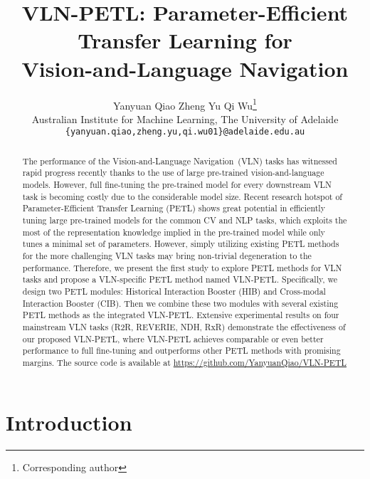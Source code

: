 \documentclass[10pt,twocolumn,letterpaper]{article}
\begin{document}
\title{VLN-PETL: Parameter-Efficient Transfer Learning for \\Vision-and-Language Navigation}

\author{
Yanyuan Qiao \quad  Zheng Yu  \quad Qi Wu\thanks{Corresponding author}\\
Australian Institute for Machine Learning, The University of Adelaide\\
{\tt\small \{yanyuan.qiao,zheng.yu,qi.wu01\}@adelaide.edu.au}\\
}


\maketitle
\ificcvfinal\thispagestyle{empty}\fi


\begin{abstract}
The performance of the Vision-and-Language Navigation~(VLN) tasks has witnessed rapid progress recently thanks to the use of large pre-trained vision-and-language models. However, full fine-tuning the pre-trained model for every downstream VLN task is becoming costly due to the considerable model size. Recent research hotspot of Parameter-Efficient Transfer Learning (PETL) shows great potential in efficiently tuning large pre-trained models for the common CV and NLP tasks, which exploits the most of the representation knowledge implied in the pre-trained model while only tunes a minimal set of parameters. However, simply utilizing existing PETL methods for the more challenging VLN tasks may bring non-trivial degeneration to the performance. Therefore, we present the first study to explore PETL methods for VLN tasks and propose a VLN-specific PETL method named VLN-PETL. Specifically, we design two PETL modules: Historical Interaction Booster (HIB) and Cross-modal Interaction Booster (CIB). Then we combine these two modules with several existing PETL methods as the integrated VLN-PETL. Extensive experimental results on four mainstream VLN tasks (R2R, REVERIE, NDH, RxR) demonstrate the effectiveness of our proposed VLN-PETL, where VLN-PETL achieves comparable or even better performance to full fine-tuning and outperforms other PETL methods with promising margins. The source code is available at \href{https://github.com/YanyuanQiao/VLN-PETL}{https://github.com/YanyuanQiao/VLN-PETL}
\end{abstract}

\section{Introduction}
\label{sec:intro}
\end{document}
